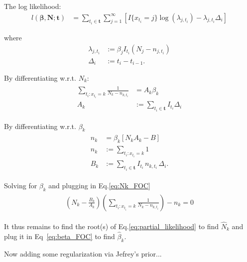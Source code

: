 \documentclass[12pt,a4paper,draft]{article}
\begin{document}
The log likelihood:
\begin{align*}
	l(\bm{\beta},\bm{N}; \bm{t}) &=
	\sum_{t_i \in \bm t} \sum_{j=1}^\infty \left[
		I\{ x_{t_i} = j \} \log(\lambda_{j,t_i}) -
		\lambda_{j,t_i} \Delta_i
	\right]	
\end{align*}

where 
\begin{align*}
	\lambda_{j,t_i} &:= \beta_j I_{t_i} (N_j-n_{j,t_i}) \\
	\Delta_i &:= t_i - t_{i-1}. 
\end{align*}

By differentiating w.r.t. $N_k$:
\begin{align}\label{eq:Nk_FOC}
\begin{split}
	\sum_{t_i:x_{t_i}=k} \frac{1}{N_k - n_{k,t_i}} &= A_k \beta_k \\
	A_k &:= \sum_{t_i \in \bm t} I_{t_i} \Delta_i
\end{split}
\end{align}

By differentiating w.r.t. $\beta_k$
\begin{align}\label{eq:beta_FOC}
\begin{split}
	n_k &= \beta_k [ N_k A_k- B ] \\
	n_k &:= \sum_{t_i:x_{t_i}=k} 1 \\
	B_k &:= \sum_{t_i \in \bm t} I_{t_i} \, n_{k,t_i} \, \Delta_i.
\end{split}
\end{align}

Solving for $\beta_k$ and plugging in Eq.\ref{eq:Nk_FOC}
\begin{align}\label{eq:partial_likelihood}
\begin{split}
	\left( N_k-\frac{B_k}{A_k} \right) 
	\left( \sum_{t_i:x_{t_i}=k}\frac{1}{N_k - n_{k,t_i}}\right) - n_{k}=0
\end{split}
\end{align}

It thus remains to find the root(s) of Eq.\ref{eq:partial_likelihood} to find $\hat{N}_k$ and plug it in Eq~\ref{eq:beta_FOC} to find $\hat{\beta}_k$.

\hrulefill
\bigskip

Now adding some regularization via Jefrey's prior...
\end{document}
